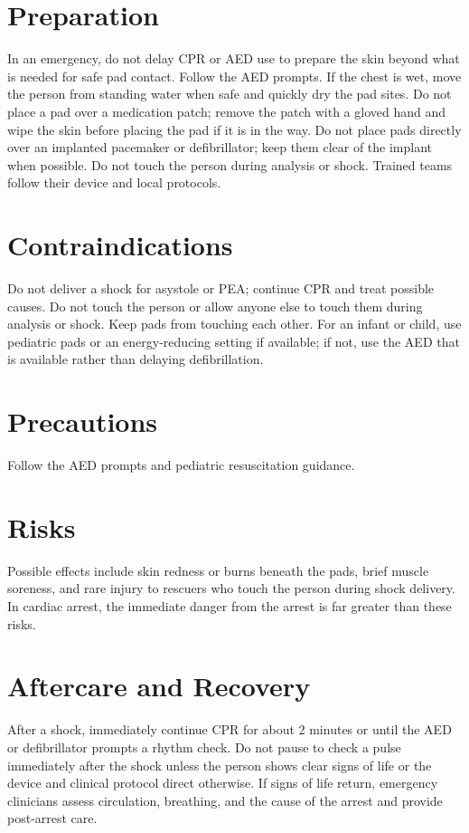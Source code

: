 \section*{Preparation}
In an emergency, do not delay CPR or AED use to prepare the skin beyond what is needed for safe pad contact. Follow the AED prompts. If the chest is wet, move the person from standing water when safe and quickly dry the pad sites. Do not place a pad over a medication patch; remove the patch with a gloved hand and wipe the skin before placing the pad if it is in the way. Do not place pads directly over an implanted pacemaker or defibrillator; keep them clear of the implant when possible. Do not touch the person during analysis or shock. Trained teams follow their device and local protocols.

\section*{Contraindications}
Do not deliver a shock for asystole or PEA; continue CPR and treat possible causes. Do not touch the person or allow anyone else to touch them during analysis or shock. Keep pads from touching each other. For an infant or child, use pediatric pads or an energy-reducing setting if available; if not, use the AED that is available rather than delaying defibrillation.

\section*{Precautions}
Follow the AED prompts and pediatric resuscitation guidance.

\section*{Risks}
Possible effects include skin redness or burns beneath the pads, brief muscle soreness, and rare injury to rescuers who touch the person during shock delivery. In cardiac arrest, the immediate danger from the arrest is far greater than these risks.

\section*{Aftercare and Recovery}
After a shock, immediately continue CPR for about 2 minutes or until the AED or defibrillator prompts a rhythm check. Do not pause to check a pulse immediately after the shock unless the person shows clear signs of life or the device and clinical protocol direct otherwise. If signs of life return, emergency clinicians assess circulation, breathing, and the cause of the arrest and provide post-arrest care.

